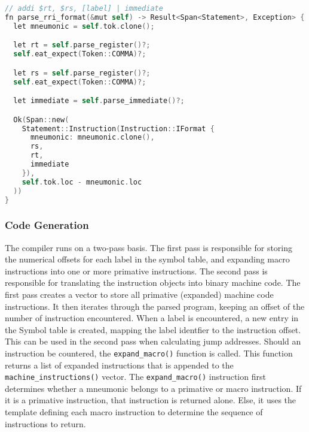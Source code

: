 \label{AssemblerParseRRIFormat}
\begin{lstlisting}[language=C]
// addi $rt, $rs, [label] | immediate
fn parse_rri_format(&mut self) -> Result<Span<Statement>, Exception> {
  let mneumonic = self.tok.clone();

  let rt = self.parse_register()?;
  self.eat_expect(Token::COMMA)?;

  let rs = self.parse_register()?;
  self.eat_expect(Token::COMMA)?;

  let immediate = self.parse_immediate()?;

  Ok(Span::new(
    Statement::Instruction(Instruction::IFormat { 
      mneumonic: mneumonic.clone(), 
      rs, 
      rt, 
      immediate 
    }),
    self.tok.loc - mneumonic.loc
  ))
}
\end{lstlisting}

\subsubsection{Code Generation}
The compiler runs on a two-pass basis. The first pass is responsible for storing the numerical offsets for each label in the symbol table, and expanding macro instructions into one or more primative instructions. The second pass is responsible for translating the instruction objects into binary machine code. The first pass creates a vector to store all primative (expanded) machine code instructions. It then iterates through the parsed program, keeping an offset of the number of instruction encountered. When a label is encountered, a new entry in the Symbol table is created, mapping the label identfier to the instruction offset. This can be used in the second pass when calculating jump addresses. Should an instruction be countered, the \texttt{expand\_macro()} function is called. This function returns a list of expanded instructions that is appended to the \texttt{machine\_instructions()} vector. The \texttt{expand\_macro()} instruction first determines whether a mneumonic belongs to a primative or macro instruction. If it is a primative instruction, that instruction is returned alone. Else, it uses the template defining each macro instruction to determine the sequence of instructions to return.

